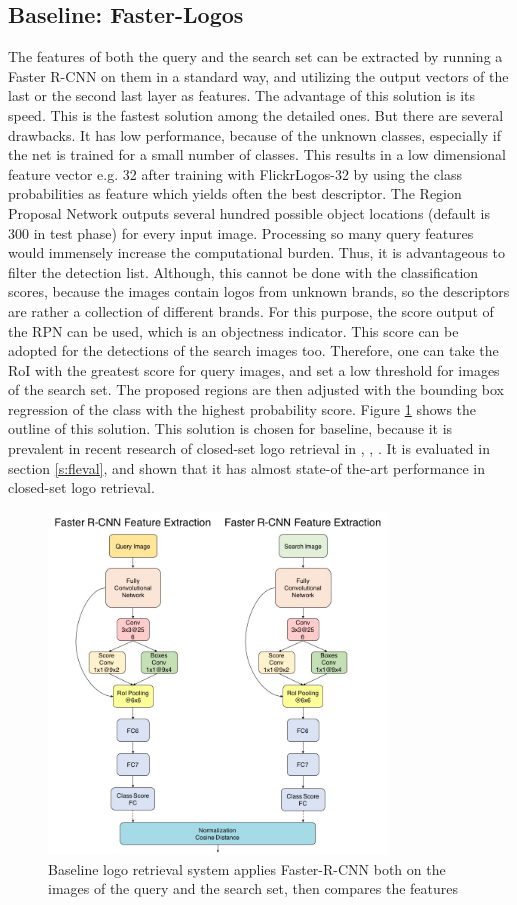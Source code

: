 \subsection{Baseline: Faster-Logos}\label{ss:solution1}
The features of both the query and the search set can be extracted by running a Faster R-CNN on them in a standard way, and utilizing the output vectors of the last or the second last layer as features. The advantage of this solution is its speed. This is the fastest solution among the detailed ones. But there are several drawbacks. It has low performance, because of the unknown classes, especially if the net is trained for a small number of classes. This results in a low dimensional feature vector e.g. 32 after training with FlickrLogos-32 by using the class probabilities as feature which yields often the best descriptor.
\bigbreak
The Region Proposal Network outputs several hundred possible object locations (default is 300 in test phase) for every input image. Processing so many query features would immensely increase the computational burden. Thus, it is advantageous to filter the detection list. Although, this cannot be done with the classification scores, because the images contain logos from unknown brands, so the descriptors are rather a collection of different brands. For this purpose, the score output of the RPN can be used, which is an objectness indicator. This score can be adopted for the detections of the search images too. Therefore, one can take the RoI with the greatest score for query images, and set a low threshold for images of the search set. The proposed regions are then adjusted with the bounding box regression of the class with the highest probability score. Figure \ref{f:sol1arch} shows the outline of this solution. This solution is chosen for baseline, because it is prevalent in recent research of closed-set logo retrieval in \cite{Bao:2016:RCL:3007669.3007728}, \cite{DBLP:journals/corr/OliveiraFPR16}, \cite{DBLP:journals/spl/QiSWX17}. It is evaluated in section \ref{s:fleval}, and shown that it has almost state-of the-art performance in closed-set logo retrieval.
\begin{figure}
  \centering
  \includegraphics[width=90mm]{images/mt/sol1_arch.jpg}
  \caption{Baseline logo retrieval system applies Faster-R-CNN both on the images of the query and the search set, then compares the features}
  \label{f:sol1arch}
\end{figure}
